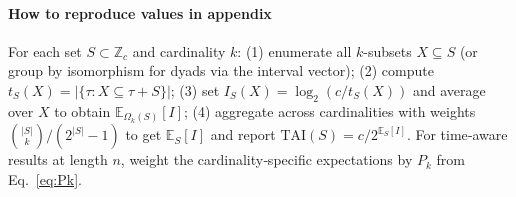 \documentclass[10pt,twocolumn]{article}
\numberwithin{equation}{section} %
\begin{document}
    \setlength{\aboverulesep}{0.3ex}
    \setlength{\belowrulesep}{0.3ex}

    \tablelasttail{\bottomrule}

    

    \endgroup

    \paragraph{How to reproduce values in appendix}
    \small
    For each set $S\subset\mathbb{Z}_c$ and cardinality $k$:
    (1) enumerate all $k$-subsets $X\subseteq S$ (or group by isomorphism for dyads via the interval vector);
    (2) compute $t_S(X)=|\{\tau : X\subseteq\tau{+}S\}|$;
    (3) set $I_S(X)=\log_2(c/t_S(X))$ and average over $X$ to obtain $\mathbb{E}_{\Omega_k(S)}[I]$;
    (4) aggregate across cardinalities with weights $\binom{|S|}{k}/(2^{|S|}-1)$ to get $\mathbb{E}_S[I]$ and report $\mathrm{TAI}(S)=c/2^{\mathbb{E}_S[I]}$.
    For time‑aware results at length $n$, weight the cardinality‑specific expectations by $P_k$ from Eq.~\ref{eq:Pk}.
\end{document}
